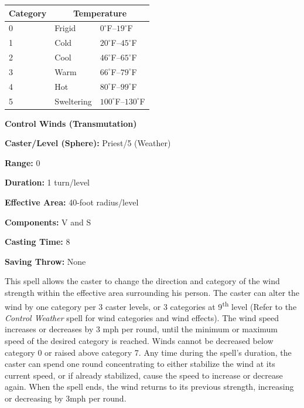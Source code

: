 \begin{multicols}{2}
\noindent
\begin{tabular}{|p{}|p{}|p{}|}
\hline
Category	& \multicolumn{2}{c|}{Temperature} \\
\hline\hline
\rowcolor[gray]{.9}0	& Frigid		& $0^\circ$F--$19^\circ$F \\
1	& Cold		& $20^\circ$F--$45^\circ$F \\
\rowcolor[gray]{.9}2	& Cool		& $46^\circ$F--$65^\circ$F \\
3	& Warm		& $66^\circ$F--$79^\circ$F \\
\rowcolor[gray]{.9}4	& Hot			& $80^\circ$F--$99^\circ$F \\
5	& Sweltering	& $100^\circ$F--$130^\circ$F \\
\hline
\end{tabular}

\vspace{1em}

\noindent
\begin{minipage}{\columnwidth}

\noindent \textbf{Control Winds (Transmutation)}

\noindent \textbf{Caster/Level (Sphere):} Priest/5 (Weather)

\noindent \textbf{Range:} 0

\noindent \textbf{Duration:} 1 turn/level

\noindent \textbf{Effective Area:} 40-foot radius/level

\noindent \textbf{Components:} V and S

\noindent \textbf{Casting Time:} 8

\noindent \textbf{Saving Throw:} None

\end{minipage}

This spell allows the caster to change the direction and category of the wind strength within the effective area surrounding his person.  The caster can alter the wind by one category per 3 caster levels, or 3 categories at 9\textsuperscript{th} level (Refer to the \textit{Control Weather} spell for wind categories and wind effects).  The wind speed increases or decreases by 3 mph per round, until the minimum or maximum speed of the desired category is reached.  Winds cannot be decreased below category 0 or raised above category 7.  Any time during the spell's duration, the caster can spend one round concentrating to either stabilize the wind at its current speed, or if already stabilized, cause the speed to increase or decrease again.  When the spell ends, the wind returns to its previous strength, increasing or decreasing by 3mph per round.


\end{multicols}
